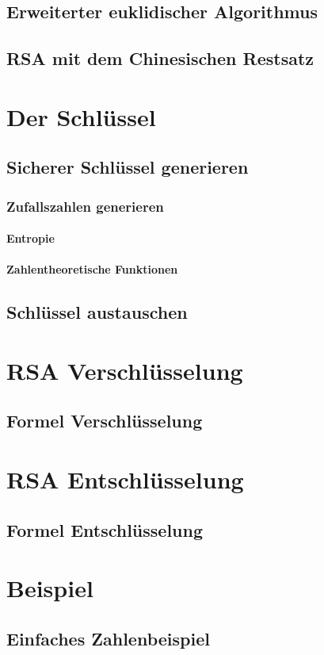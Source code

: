 \documentclass[12pt,a4paper,german]{article}
\begin{document}
\subsection{Erweiterter euklidischer Algorithmus}
\subsection{RSA mit dem Chinesischen Restsatz}
\section{Der Schlüssel}
\subsection{Sicherer Schlüssel generieren}
\subsubsection{Zufallszahlen generieren}
\paragraph{Entropie}
\paragraph{Zahlentheoretische Funktionen}
\subsection{Schlüssel austauschen}
\section{RSA Verschlüsselung}
\subsection{Formel Verschlüsselung}
\section{RSA Entschlüsselung}
\subsection{Formel Entschlüsselung}
\section{Beispiel}
\subsection{Einfaches Zahlenbeispiel}
\end{document}
